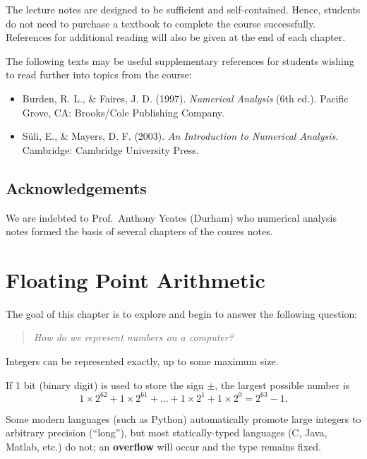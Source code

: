 \documentclass[
  letterpaper,
  DIV=11,
  numbers=noendperiod]{scrreprt}
\providecommand{\tightlist}{%
  \setlength{\itemsep}{0pt}\setlength{\parskip}{0pt}}
\begin{document}
The lecture notes are designed to be sufficient and self-contained.
Hence, students do not need to purchase a textbook to complete the
course successfully. References for additional reading will also be
given at the end of each chapter.

The following texts may be useful supplementary references for students
wishing to read further into topics from the course:

\begin{itemize}
\tightlist
\item
  Burden, R. L., \& Faires, J. D. (1997). \emph{Numerical Analysis} (6th
  ed.). Pacific Grove, CA: Brooks/Cole Publishing Company.
\item
  Süli, E., \& Mayers, D. F. (2003). \emph{An Introduction to Numerical
  Analysis}. Cambridge: Cambridge University Press.
\end{itemize}

\section*{Acknowledgements}\label{acknowledgements}


We are indebted to Prof.~Anthony Yeates (Durham) who numerical analysis
notes formed the basis of several chapters of the coures notes.


\chapter{Floating Point Arithmetic}\label{floating-point-arithmetic}

The goal of this chapter is to explore and begin to answer the following
question:

\begin{quote}
\emph{How do we represent numbers on a computer?}
\end{quote}

Integers can be represented exactly, up to some maximum size.

If 1 bit (binary digit) is used to store the sign \(\pm\), the largest
possible number is \[
1\times 2^{62} +1\times 2^{61} + \ldots + 1\times 2^{1} + 1\times 2^{0} = 2^{63}-1.
\]

\begin{tcolorbox}[enhanced jigsaw, arc=.35mm, toprule=.15mm, colframe=quarto-callout-note-color-frame, left=2mm, toptitle=1mm, titlerule=0mm, breakable, opacityback=0, bottomtitle=1mm, title=\textcolor{quarto-callout-note-color}{\faInfo}\hspace{0.5em}{Note}, rightrule=.15mm, opacitybacktitle=0.6, colbacktitle=quarto-callout-note-color!10!white, colback=white, leftrule=.75mm, bottomrule=.15mm, coltitle=black]

Some modern languages (such as Python) automatically promote large
integers to arbitrary precision (``long''), but most statically-typed
languages (C, Java, Matlab, etc.) do not; an \textbf{overflow} will
occur and the type remains fixed.

\end{tcolorbox}
\end{document}
